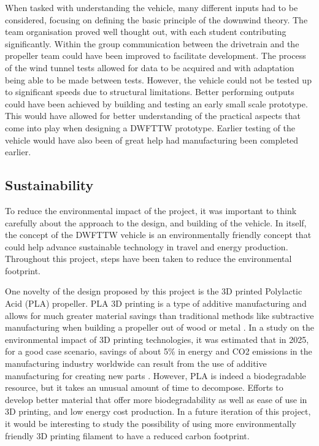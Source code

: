 When tasked with understanding the vehicle, many different inputs had to be considered, focusing on defining the basic principle of the downwind theory. The team organisation proved well thought out, with each student contributing significantly. Within the group communication between the drivetrain and the propeller team could have been improved to facilitate development. The process of the wind tunnel tests allowed for data to be acquired and with adaptation being able to be made between tests.  However, the vehicle could not be tested up to significant speeds due to structural limitations. 
Better performing outputs could have been achieved by building and testing an early small scale prototype. This would have allowed for better understanding of the practical aspects that come into play when designing a DWFTTW prototype. Earlier testing of the vehicle would have also been of great help had manufacturing been completed earlier.

\subsection{Sustainability}

To reduce the environmental impact of the project, it was important to think carefully about the approach to the design, and building of the vehicle. In itself, the concept of the DWFTTW vehicle is an environmentally friendly concept that could help advance sustainable technology in travel and energy production. Throughout this project, steps have been taken to reduce the environmental footprint.

One novelty of the design proposed by this project is the 3D printed Polylactic Acid (PLA) propeller. PLA 3D printing is a type of additive manufacturing and allows for much greater material savings than traditional methods like subtractive manufacturing when building a propeller out of wood or metal \cite{useOfBioPLA}. In a study on the environmental impact of 3D printing technologies, it was estimated that in 2025, for a good case scenario, savings of about 5\% in energy and CO2 emissions in the manufacturing industry worldwide can result from the use of additive manufacturing for creating new parts \cite{3DSustain}. However, PLA is indeed a biodegradable resource, but it takes an unusual amount of time to decompose. Efforts to develop better material that offer more biodegradability as well as ease of use in 3D printing, and low energy cost production. In a future iteration of this project, it would be interesting to study the possibility of using more environmentally friendly 3D printing filament to have a reduced carbon footprint.

